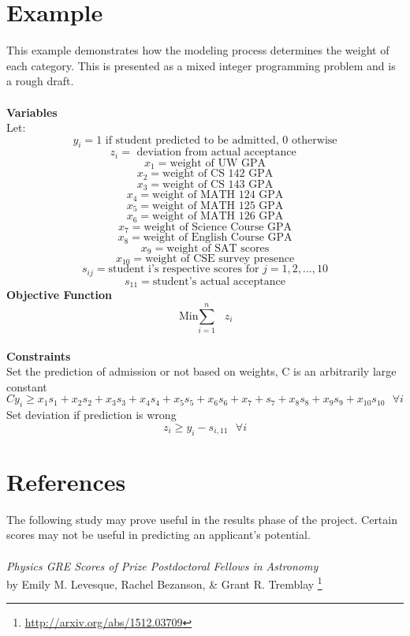 \documentclass[11pt]{article}
\begin{document}
\section{Example}

This example demonstrates how the modeling process determines the weight of each category. This is presented as a mixed integer programming problem and is a rough draft.
\\\\
\textbf{Variables}\\
Let: \[y_i = 1 \text{ if student predicted to be admitted, } 0 \text{ otherwise}\]
\[z_i =  \text{ deviation from actual acceptance }\]
\[x_1 = \text{weight of UW GPA}\]
\[x_2 = \text{weight of CS 142 GPA}\]
\[x_3 = \text{weight of CS 143 GPA}\]
\[x_4 = \text{weight of MATH 124 GPA}\]
\[x_5 = \text{weight of MATH 125 GPA}\]
\[x_6 = \text{weight of MATH 126 GPA}\]
\[x_7 = \text{weight of Science Course GPA}\]
\[x_8 = \text{weight of English Course GPA}\]
\[x_9 = \text{weight of SAT scores}\]
\[x_{10} = \text{weight of CSE survey presence}\]
\[s_{ij} = \text{student i's respective scores for } j = 1,2,...,10\]
\[s_{11} = \text{student's actual acceptance}\]
\textbf{Objective Function}
\[ \text{Min\(\sum\limits_{i=1}^n\) }z_i\]
\\
\textbf{Constraints}\\
Set the prediction of admission or not based on weights, C is an arbitrarily large constant
\[Cy_i \geq x_1s_1 + x_2s_2 + x_3s_3 + x_4s_4 + x_5s_5 + x_6s_6 + x_7+s_7 + x_8s_8 + x_9s_9 + x_{10}s_{10}   \text{   }\forall i\]
Set deviation if prediction is wrong
\[z_i \geq y_i - s_{i,11} \text{  }\forall i\]


\section{References}
The following study may prove useful in the results phase of the project. Certain scores may not be useful in predicting an applicant's potential.\\\\
\emph{Physics GRE Scores of Prize Postdoctoral Fellows in Astronomy}\\ by Emily M. Levesque, Rachel Bezanson, \& Grant R. Tremblay \footnote{\url{http://arxiv.org/abs/1512.03709}}
\end{document}
